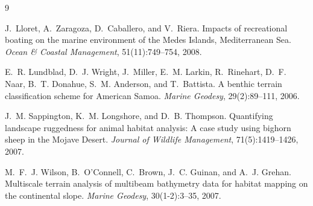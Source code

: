 \documentclass[a4paper,11pt]{article}
\begin{document}
\begingroup
\renewcommand{\section}[2]{}  %
\begin{thebibliography}{9}

J.~Lloret, A.~Zaragoza, D.~Caballero, and V.~Riera.
\newblock Impacts of recreational boating on the marine environment of the Medes Islands,
Mediterranean Sea.
\newblock \emph{Ocean \& Coastal Management}, 51(11):749--754, 2008.

E.~R. Lundblad, D.~J. Wright, J.~Miller, E.~M. Larkin, R.~Rinehart, D.~F. Naar,
B.~T. Donahue, S.~M. Anderson, and T.~Battista.
\newblock A benthic terrain classification scheme for American Samoa.
\newblock \emph{Marine Geodesy}, 29(2):89--111, 2006.

J.~M. Sappington, K.~M. Longshore, and D.~B. Thompson.
\newblock Quantifying landscape ruggedness for animal habitat analysis: A case study
using bighorn sheep in the Mojave Desert.
\newblock \emph{Journal of Wildlife Management}, 71(5):1419--1426, 2007.

M.~F.~J. Wilson, B.~O'Connell, C.~Brown, J.~C. Guinan, and A.~J. Grehan.
\newblock Multiscale terrain analysis of multibeam bathymetry data for habitat mapping
on the continental slope.
\newblock \emph{Marine Geodesy}, 30(1-2):3--35, 2007.

\end{thebibliography}
\endgroup
\end{document}
